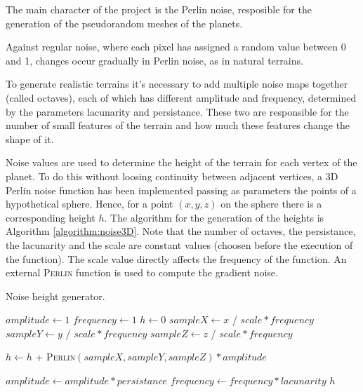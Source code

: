 \documentclass[paper=a4, fontsize=11pt]{scrartcl} %
\numberwithin{equation}{section} %
\numberwithin{figure}{section} %
\numberwithin{table}{section} %
\theoremstyle{definition}
\begin{document}
The main character of the project is the Perlin noise, resposible for the
generation of the pseudorandom meshes of the planets.

Against regular noise, where each pixel has assigned a random value between 0
and 1, changes occur gradually in Perlin noise, as in natural terrains.

To generate realistic terrains it's necessary to add multiple noise maps
together (called octaves), each of which has different amplitude and frequency,
determined by the parameters lacunarity and persistance. These two are
responsible for the number of small features of the terrain and how much
these features change the shape of it.

Noise values are used to determine the height of the terrain for each vertex of
the planet. To do this without loosing continuity between adjacent vertices, a 3D
Perlin noise function has been implemented passing as parameters the points of
a hypothetical sphere. Hence, for a point $(x, y, z)$ on the sphere there is a
corresponding height $h$.
The algorithm for the generation of the heights is
Algorithm \ref{algorithm:noise3D}. Note that the number of octaves, the persistance,
the lacunarity and the scale are constant values (choosen before the execution
of the function). The scale value directly affects the frequency of the function.
An external \textsc{Perlin} function is used to compute the gradient noise.

\begin{algorithm}
	\caption{Noise height generator.}
	\label{algorithm:noise3D}
	\begin{algorithmic}[1]
			\State $amplitude \gets 1$
			\State $frequency \gets 1$
			\State $h \gets 0$
				\State $sampleX \gets x$ / $scale * frequency$
				\State $sampleY \gets y$ / $scale * frequency$
				\State $sampleZ \gets z$ / $scale * frequency$
				
				\State $h \gets h$ + \textsc{Perlin}$(sampleX, sampleY, sampleZ) * amplitude$
				
				\State $amplitude \gets amplitude * persistance$
				\State $frequency \gets frequency * lacunarity$
			\EndFor
			\State \Return $h$
		\EndFunction
	\end{algorithmic}
\end{algorithm}

\end{document}
